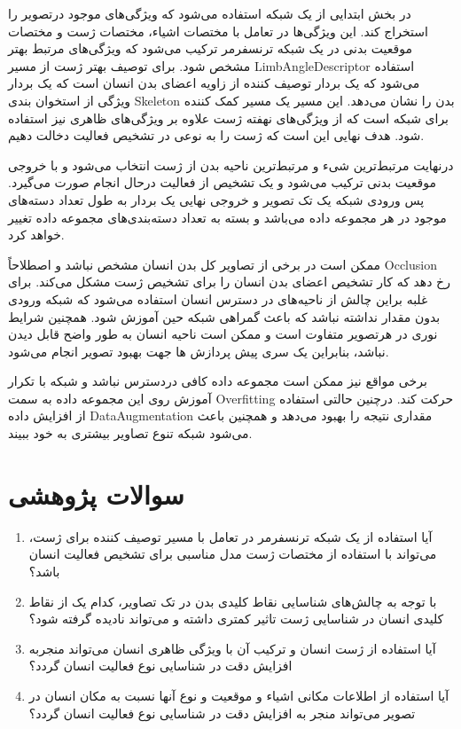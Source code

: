 در بخش ابتدایی از یک شبکه استفاده می‌شود که ویژگی‌های موجود درتصویر را استخراج کند. این ویژگی‌ها در تعامل با مختصات اشیاء، مختصات ژست و مختصات موقعیت بدنی در یک شبکه ترنسفرمر ترکیب می‌شود که ویژگی‌های مرتبط بهتر مشخص شود. برای توصیف بهتر ژست از مسیر%
\gls{LimbAngleDescriptor}
 استفاده می‌شود که یک بردار توصیف کننده از زاویه اعضای بدن انسان است که یک بردار ویژگی از استخوان بندی%
 \gls{Skeleton}
  بدن را نشان می‌دهد. این مسیر یک مسیر کمک کننده برای شبکه است که از ویژگی‌های نهفته ژست علاوه بر ویژگی‌های ظاهری نیز استفاده شود. هدف نهایی این است که ژست را به نوعی در تشخیص فعالیت دخالت دهیم.

درنهایت مرتبط‌ترین شیء و مرتبط‌ترین ناحیه بدن از ژست انتخاب می‌شود و با خروجی موقعیت بدنی ترکیب می‌شود و یک تشخیص از فعالیت درحال انجام صورت می‌گیرد. پس ورودی شبکه یک تک تصویر و خروجی نهایی یک بردار به طول تعداد دسته‌های موجود در هر مجموعه ‌داده می‌باشد و بسته به تعداد دسته‌بندی‌های مجموعه داده تغییر خواهد کرد. 

ممکن است در برخی از تصاویر کل بدن انسان مشخص نباشد و اصطلاحاً %
\gls{Occlusion}
 رخ دهد که کار تشخیص اعضای بدن انسان را برای تشخیص ژست مشکل می‌کند. برای غلبه براین چالش از ناحیه‌های در دسترس انسان استفاده می‌شود که شبکه ورودی بدون مقدار نداشته نباشد که باعث گمراهی شبکه حین آموزش شود. همچنین شرایط نوری در هرتصویر متفاوت است و ممکن است ناحیه انسان به طور واضح قابل دیدن نباشد، بنابراین یک سری پیش پردازش ها جهت بهبود تصویر انجام می‌شود.

برخی مواقع نیز ممکن است مجموعه داده کافی دردسترس نباشد و شبکه با تکرار آموزش روی این مجموعه داده به سمت %
\gls{Overfitting}
 حرکت کند. درچنین حالتی استفاده از افزایش داده%
 \gls{DataAugmentation}
  مقداری نتیجه را بهبود می‌دهد و همچنین باعث می‌شود شبکه تنوع تصاویر بیشتری به خود ببیند.
\section{سوالات پژوهشی} 
\begin{enumerate}
	\item 
	آیا استفاده از یک شبکه ترنسفرمر در تعامل با مسیر توصیف کننده برای ژست، می‌تواند با استفاده از مختصات ژست مدل مناسبی برای تشخیص فعالیت انسان باشد؟
	\item
	با توجه به چالش‌های شناسایی نقاط کلیدی بدن در تک تصاویر، کدام یک از نقاط کلیدی انسان در شناسایی ژست تاثیر کمتری داشته و می‌‌تواند نادیده گرفته شود؟
	\item
	آیا استفاده از ژست انسان و ترکیب آن با ویژگی ظاهری انسان می‌تواند منجربه افزایش دقت در شناسایی نوع فعالیت انسان گردد؟
	\item
	آیا استفاده از اطلاعات مکانی اشیاء و موقعیت و نوع آنها نسبت به مکان انسان در تصویر می‌تواند منجر به افزایش دقت در شناسایی نوع فعالیت انسان گردد؟
\end{enumerate}

